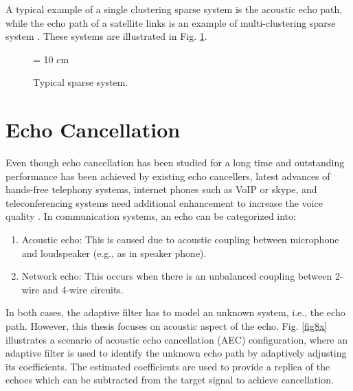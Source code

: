 \vspace{-0.3cm}
\par
\noindent A typical example of a single clustering sparse system is the acoustic echo path, while the echo path of a satellite links is an example of multi-clustering sparse system \cite{Gu1}. These systems are illustrated in Fig. \ref{fig7x}.

\begin{figure}[!htb]
\begin{center}
\vspace{1cm}
\epsfxsize = 10 cm
\end{center}
\vspace{-1cm}
\caption{Typical sparse system.}
\label{fig7x}
\end{figure}


\section{Echo Cancellation}\label{sec:1.5}
\vspace{-0.5cm}
\noindent Even though echo cancellation has been studied for a long time and outstanding performance has been achieved by existing echo cancellers,
latest advances of hands-free telephony systems, internet phones such as VoIP or skype, and teleconferencing systems need additional
enhancement to increase the voice quality \cite{Christina}. In communication systems, an echo can be categorized into:

\vspace{-0.3cm}
\begin{enumerate} \vspace{-0.3cm}
\item Acoustic echo:  This is caused due to acoustic coupling between microphone and loudspeaker (e.g., as in speaker phone).

\vspace{-0.3cm}
\item Network echo: This occurs when there is an unbalanced coupling between 2-wire and 4-wire circuits.

\end{enumerate}
\vspace{-1cm}
\par
\noindent In both cases, the adaptive filter has to model an unknown system, i.e., the echo path. However, this thesis focuses on acoustic aspect of the echo. Fig. \ref{fig8x} illustrates a scenario of acoustic echo cancellation (AEC) configuration, where an adaptive filter is used to identify the unknown echo path by adaptively adjusting its coefficients. The estimated coefficients are used to provide a replica of the echoes which can be subtracted from the target signal to achieve cancellation.

